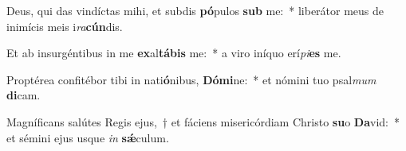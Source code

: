 \item Deus, qui das vindíctas mihi, et subdis \textbf{pó}pulos \textbf{sub} me:~* liberátor meus de inimícis meis i\textit{ra}\textbf{cún}dis.
\item Et ab insurgéntibus in me \textbf{ex}al\textbf{tá}\textbf{bis} me:~* a viro iníquo erí\textit{pi}\textbf{es} me.
\item Proptérea confitébor tibi in nati\textbf{ó}nibus, \textbf{Dó}\textbf{mi}ne:~* et nómini tuo psal\textit{mum} \textbf{di}cam.
\item Magníficans salútes Regis ejus,~† et fáciens misericórdiam Christo \textbf{su}o \textbf{Da}vid:~* et sémini ejus usque \textit{in} \textbf{sǽ}culum.
